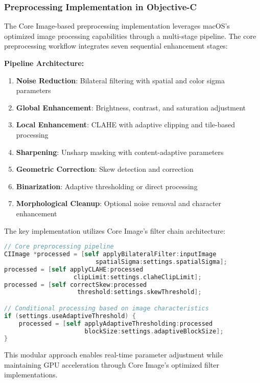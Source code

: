 \subsubsection{Preprocessing Implementation in Objective-C}

The Core Image-based preprocessing implementation leverages macOS's optimized image processing capabilities through a multi-stage pipeline. The core preprocessing workflow integrates seven sequential enhancement stages:

\textbf{Pipeline Architecture:}
\begin{enumerate}
\item \textbf{Noise Reduction}: Bilateral filtering with spatial and color sigma parameters
\item \textbf{Global Enhancement}: Brightness, contrast, and saturation adjustment
\item \textbf{Local Enhancement}: CLAHE with adaptive clipping and tile-based processing
\item \textbf{Sharpening}: Unsharp masking with content-adaptive parameters
\item \textbf{Geometric Correction}: Skew detection and correction
\item \textbf{Binarization}: Adaptive thresholding or direct processing
\item \textbf{Morphological Cleanup}: Optional noise removal and character enhancement
\end{enumerate}

The key implementation utilizes Core Image's filter chain architecture:

\begin{lstlisting}[language=C,basicstyle=\footnotesize\ttfamily,frame=single,breaklines=true,columns=flexible]
// Core preprocessing pipeline
CIImage *processed = [self applyBilateralFilter:inputImage 
                         spatialSigma:settings.spatialSigma];
processed = [self applyCLAHE:processed 
                   clipLimit:settings.claheClipLimit];
processed = [self correctSkew:processed 
                    threshold:settings.skewThreshold];

// Conditional processing based on image characteristics
if (settings.useAdaptiveThreshold) {
    processed = [self applyAdaptiveThresholding:processed 
                      blockSize:settings.adaptiveBlockSize];
}
\end{lstlisting}

This modular approach enables real-time parameter adjustment while maintaining GPU acceleration through Core Image's optimized filter implementations.

